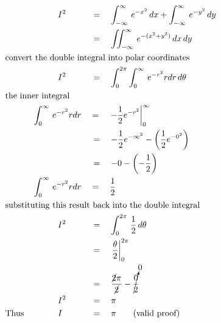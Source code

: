 \begin{alignat*}{5}
&\,&&\qquad\quad I^2&&\,=\quad\int_{-\infty}^\infty\,e^{-x^2}\,dx+\int_{-\infty}^\infty\,e^{-y^2}\,dy\\
&\,&&\,&&\,=\quad\iint_{-\infty}^\infty\,e^{-(x^2+y^2)}\,dx\,dy\\
&\rlap{\text{convert the double integral into polar coordinates}}\\
&\,&&\qquad\quad I^2&&\,=\quad\int_0^{2\pi}\int_0^\infty\,e^{-r^2}rdr\,d\theta\\
&\rlap{\text{the inner integral}}\\
&\,&&\int_0^\infty\,e^{-r^2}rdr&&=\quad\left.-\frac{1}{2}e^{-r^2}\right\vert_0^\infty\\
&\,&&\,&&\,=\quad-\frac{1}{2}e^{-\infty^2}-\left(\frac{1}{2}e^{-0^2}\right)\\
&\,&&\,&&\,=\quad-0-\left(-\frac{1}{2}\right)\\
&\,&&\int_0^\infty\,e^{-r^2}rdr&&=\quad\frac{1}{2}\\
&\rlap{\text{substituting this result back into the double integral}}\\
&\,&&\qquad\quad I^2&&\,=\quad\int_0^{2\pi}\,\frac{1}{2}\,d\theta\\
&\,&&\,&&\,=\quad\left.\frac{\theta}{2}\right\vert_0^{2\pi}\\
&\,&&\,&&\,=\quad\frac{\cancel{2}\pi}{\cancel{2}}-\cancelto{0}{\frac{0}{2}}\\
&\,&&\qquad\quad I^2&&\,=\quad\pi\\
&\text{Thus}&&\qquad\quad I&&\,=\quad\pi\qquad\text{(valid proof)}
\end{alignat*}

